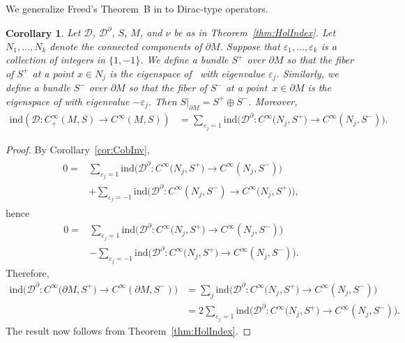 \documentclass[pdftex]{sigma}
\numberwithin{equation}{section}
\newtheorem{Corollary}[Theorem]{Corollary}
\begin{document}
We generalize Freed's Theorem~B in \cite{Freed} to Dirac-type operators.

\begin{Corollary}\label{cor:Freed}
Let $\mathcal{D}$, $\mathcal{D}^\partial$, $S$, $M$, and $\nu$ be as in Theorem~{\rm\ref{thm:HolIndex}}.
Let $N_1,\hdots,N_k$ denote the connected components of $\partial M$.
Suppose that $\varepsilon_1,\hdots,\varepsilon_k$ is a collection of integers in $\{1,-1\}$. We define a bundle $S^+$ over $\partial M$ so that the fiber of $S^+$ at a point $x \in N_j$ is the eigenspace of~ with eigenvalue $\varepsilon_j$. Similarly, we define a bundle $S^-$ over $\partial M$ so that the fiber of $S^-$ at a point~${x \in \partial M}$ is the eigenspace of  with eigenvalue $-\varepsilon_j$. Then $S|_{\partial M} = S^+ \oplus S^-$. Moreover,
\begin{align*}
\mathrm{ind}(\mathcal{D}\colon C^\infty_+(M,S)\to C^\infty(M,S))
&=
\sum_{\varepsilon_j=1} \mathrm{ind}\big(\mathcal{D}^\partial\colon C^\infty\big(N_j,S^+\big)\to C^\infty(N_j,S^-)\big) .
\end{align*}
\end{Corollary}

\begin{proof}
By Corollary~\ref{cor:CobInv},
\begin{align*}
\begin{aligned}
0
={}&
\sum_{\varepsilon_j=1} \mathrm{ind}\big(\mathcal{D}^\partial\colon C^\infty\big(N_j,S^+\big)\to C^\infty(N_j,S^-)\big) \\
& + \sum_{\varepsilon_j=-1} \mathrm{ind}\big(\mathcal{D}^\partial\colon C^\infty(N_j,S^-)\to C^\infty\big(N_j,S^+\big)\big),
\end{aligned}
\end{align*}
hence
\begin{align*}
0
={}&
\sum_{\varepsilon_j=1} \mathrm{ind}\big(\mathcal{D}^\partial\colon C^\infty\big(N_j,S^+\big)\to C^\infty(N_j,S^-)\big) \\
& - \sum_{\varepsilon_j=-1} \mathrm{ind}\big(\mathcal{D}^\partial\colon C^\infty\big(N_j,S^+\big)\to C^\infty(N_j,S^-)\big) .
\end{align*}
Therefore,
\begin{align*}
\mathrm{ind}\big(\mathcal{D}^\partial\colon C^\infty\big(\partial M,S^+\big)\to C^\infty(\partial M,S^-)\big)
&=
\sum_j \mathrm{ind}\big(\mathcal{D}^\partial\colon C^\infty\big(N_j,S^+\big)\to C^\infty(N_j,S^-)\big) \\
&=
2 \sum_{\varepsilon_j=1} \mathrm{ind}\big(\mathcal{D}^\partial\colon C^\infty\big(N_j,S^+\big)\to C^\infty(N_j,S^-)\big).
\end{align*}
The result now follows from Theorem~\ref{thm:HolIndex}.
\end{proof}
\end{document}
